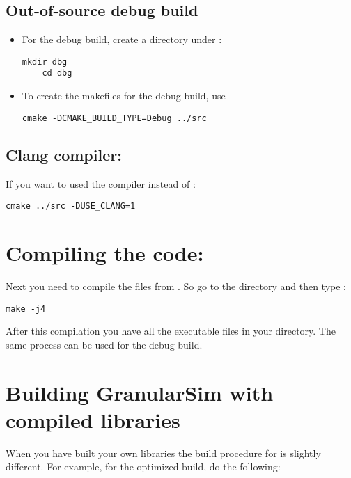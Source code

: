 \documentclass[11pt,fleqn]{book} %
\begin{document}
\subsection{ Out-of-source debug build}
\begin{itemize}
 \item For the debug build, create a directory  under :

\begin{lstlisting}[backgroundcolor=\color{background}]
    mkdir dbg
    cd dbg
\end{lstlisting}

 \item To create the makefiles for the debug build, use

\begin{lstlisting}[backgroundcolor=\color{background}]
    cmake -DCMAKE_BUILD_TYPE=Debug ../src
\end{lstlisting}

\end{itemize}

\subsection{ Clang compiler:}
If you want to used the  compiler instead of :

\begin{lstlisting}[backgroundcolor=\color{background}]
    cmake ../src -DUSE_CLANG=1
\end{lstlisting}

\section{Compiling the code:}
Next you need to compile the files from . So go to the  directory and then type : 
\begin{lstlisting}[backgroundcolor=\color{background}]
make -j4
\end{lstlisting}

After this compilation you have all the executable files in your  directory.
The same process can  be used for the debug build.

\section{Building GranularSim with compiled libraries}
When you have built your own libraries the build procedure for  is slightly different. 
For example, for the optimized build, do the following:
\end{document}

